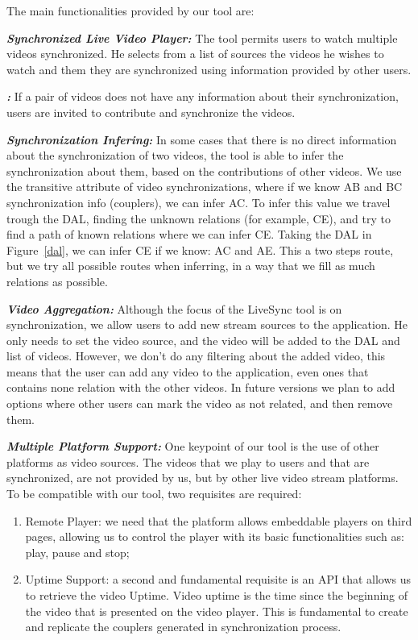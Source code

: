 
The main functionalities provided by our tool are:

\textbf{\textit{Synchronized Live Video Player:}} The tool permits users to watch multiple videos synchronized. He selects from a list of sources the videos he wishes to watch and them they are synchronized using information provided by other users.

\textbf{\textit{:}} If a pair of videos does not have any information about their synchronization, users are invited to contribute and synchronize the videos.

\textbf{\textit{Synchronization Infering:}}	
	In some cases that there is no direct information about the synchronization of two videos, the tool is able to infer the synchronization about them, based on the contributions of other videos. We use the transitive attribute of video synchronizations, where if we know AB and BC synchronization info (couplers), we can infer AC. To infer this value we travel trough the DAL, finding the unknown relations (for example, CE), and try to find a path of known relations where we can infer CE. Taking the DAL in Figure~\ref{dal}, we can infer CE if we know: AC and AE. This a two steps route, but we try all possible routes when inferring, in a way that we fill as much relations as possible.
	
\textbf{\textit{Video Aggregation:}} Although the focus of the LiveSync tool is on synchronization, we allow users to add new stream sources to the application. He only needs to set the video source, and the video will be added to the DAL and list of videos. However, we don't do any filtering about the added video, this means that the user can add any video to the application, even ones that contains none relation with the other videos. In future versions we plan to add options where other users can mark the video as not related, and then remove them.
	
\textbf{\textit{Multiple Platform Support:}} One keypoint of our tool is the use of other platforms as video sources. The videos that we play to users and that are synchronized, are not provided by us, but by other live video stream platforms. To be compatible with our tool, two requisites are required:
	\begin{enumerate}
		\item Remote Player: we need that the platform allows embeddable players on third pages, allowing us to control the player with its basic functionalities such as: play, pause and stop;
		\item Uptime Support: a second and fundamental requisite is an API that allows us to retrieve the video Uptime. Video uptime is the time since the beginning of the video that is presented on the video player. This is fundamental to create and replicate the couplers generated in synchronization process.
	\end{enumerate}

